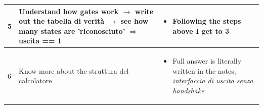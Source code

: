 \documentclass[a4paper,12pt]{article}
\begin{document}
\begin{tabular}{|C{0.7cm}|C{8cm}|C{8cm}|}
        \hline

        5
        &
        Understand how gates work $\rightarrow$ write out the tabella di verità $\rightarrow$ see how many states are 'riconosciuto' $\Rightarrow$ uscita == 1
        &
         \begin{itemize}[label=\(\rightarrow\)]
            \item Following the steps above I get to 3
        \end{itemize}
        \\
        \hline

        6
        &
        Know more about the struttura del calcolatore
        &
         \begin{itemize}[label=\(\rightarrow\)]
            \item Full answer is literally written in the notes, \textit{interfaccia di uscita senza handshake}
        \end{itemize}
        \\
        \hline

    \end{tabular}


\newpage
\end{document}
